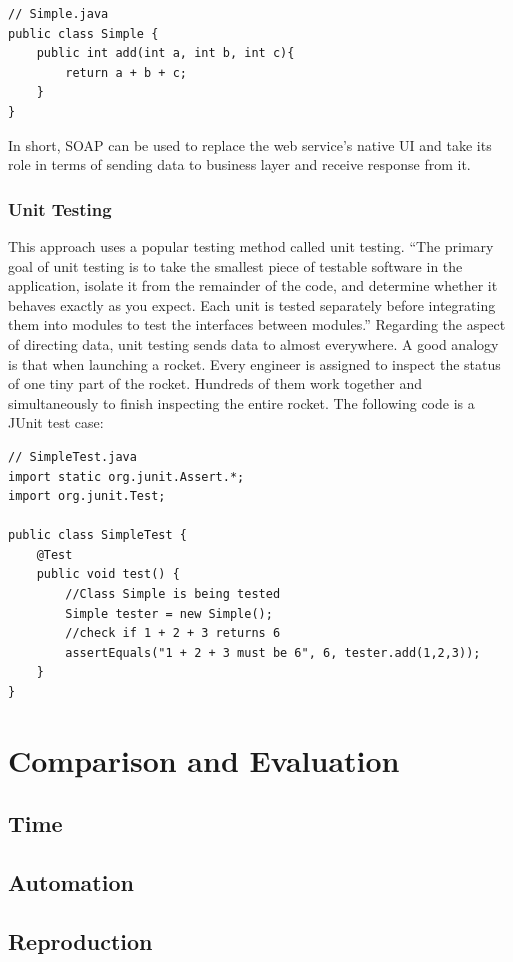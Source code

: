 \documentclass[12pt]{article}
\begin{document}
\begin{lstlisting}
// Simple.java
public class Simple {
	public int add(int a, int b, int c){
		return a + b + c;
	}
}

\end{lstlisting}

In short, SOAP can be used to replace the web service's native UI and take its role in terms of sending data to business layer and receive response from it.

\subsubsection{Unit Testing}
This approach uses a popular testing method called unit testing. “The primary goal of unit testing is to take the smallest piece of testable software in the application, isolate it from the remainder of the code, and determine whether it behaves exactly as you expect. Each unit is tested separately before integrating them into modules to test the interfaces between modules.”\cite{unit} Regarding the aspect of directing data, unit testing sends data to almost everywhere. A good analogy is that when launching a rocket. Every engineer is assigned to inspect the status of one tiny part of the rocket. Hundreds of them work together and simultaneously to finish inspecting the entire rocket. The following code is a JUnit test case:\\
\begin{lstlisting}
// SimpleTest.java
import static org.junit.Assert.*;
import org.junit.Test;

public class SimpleTest {
	@Test
	public void test() {
		//Class Simple is being tested
		Simple tester = new Simple();
		//check if 1 + 2 + 3 returns 6
		assertEquals("1 + 2 + 3 must be 6", 6, tester.add(1,2,3));
	}
}
\end{lstlisting}
\newpage

\section{Comparison and Evaluation}

\subsection{Time}
\subsection{Automation}
\subsection{Reproduction}
\end{document}
